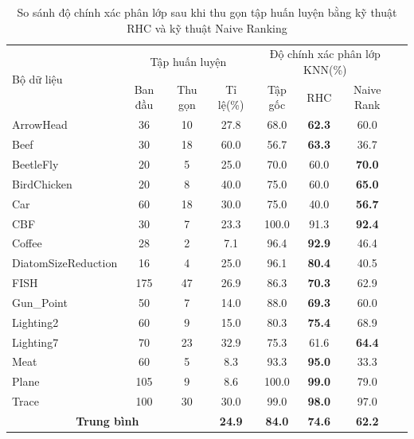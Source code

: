 \documentclass[13pt,oneside]{scrbook}
\begin{document}
\begin{table}[!htb]
\centering
    \begin{tabular}{| l | c | c | c | c | c | c | c |}
    \hline
	\multirow{2}{*}{Bộ dữ liệu} & \multicolumn{3}{c|}{Tập huấn luyện}& \multicolumn{3}{c|}{Độ chính xác phân lớp KNN(\%)}\\
	\cline{2-7}
    & Ban đầu & Thu gọn & Tỉ lệ(\%) & Tập gốc &  RHC &Naive Rank\\
	\hline
	ArrowHead & 36 & 10 & 27.8 & 68.0 & \textbf{62.3} & 60.0\\ \hline
	Beef & 30 & 18 & 60.0 & 56.7 & \textbf{63.3} & 36.7\\ \hline
	BeetleFly & 20 & 5 & 25.0 & 70.0 & 60.0 & \textbf{70.0}\\ \hline
	BirdChicken & 20 & 8 & 40.0 & 75.0 & 60.0 & \textbf{65.0}\\ \hline
	Car & 60 & 18 & 30.0 & 75.0 & 40.0 & \textbf{56.7}\\ \hline
	CBF & 30 & 7 & 23.3 & 100.0 & 91.3 & \textbf{92.4}\\ \hline
	Coffee & 28 & 2 & 7.1 & 96.4 & \textbf{92.9} & 46.4\\ \hline
	DiatomSizeReduction & 16 & 4 & 25.0 & 96.1 & \textbf{80.4} & 40.5\\ \hline
	FISH & 175 & 47 & 26.9 & 86.3 & \textbf{70.3} & 62.9\\ \hline
	Gun\_Point & 50 & 7 & 14.0 & 88.0 & \textbf{69.3} & 60.0\\ \hline
	Lighting2 & 60 & 9 & 15.0 & 80.3 & \textbf{75.4} & 68.9\\ \hline
	Lighting7 & 70 & 23 & 32.9 & 75.3 & 61.6 & \textbf{64.4}\\ \hline
	Meat & 60 & 5 & 8.3 & 93.3 & \textbf{95.0} & 33.3\\ \hline
	Plane & 105 & 9 & 8.6 & 100.0 & \textbf{99.0} & 79.0\\ \hline
	Trace & 100 & 30 & 30.0 & 99.0 & \textbf{98.0} & 97.0\\ \hline
	\multicolumn{3}{|c|}{\textbf{Trung bình}} & \textbf{24.9} & \textbf{84.0} & \textbf{74.6} & \textbf{62.2} \\ \hline
    \end{tabular}
    \caption{So sánh độ chính xác phân lớp sau khi thu gọn tập huấn luyện bằng kỹ thuật RHC và kỹ thuật Naive Ranking}\label{tab:classificationresult}
\end{table}
\end{document}
